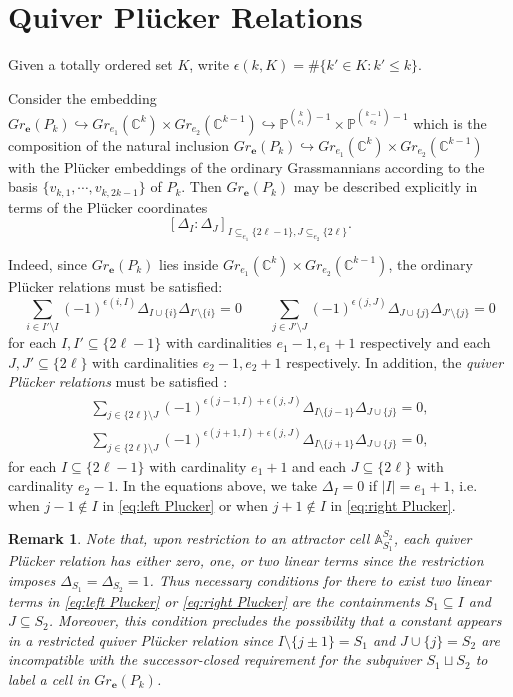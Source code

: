 \documentclass{amsart}
\newtheorem{remark}[theorem]{Remark}
\numberwithin{equation}{section}
\renewcommand{\AA}{\mathbb{A}}
\newcommand{\CC}{\mathbb{C}}
\newcommand{\PP}{\mathbb{P}}
\newcommand{\bfe}{\mathbf{e}}
\newcommand{\into}{\hookrightarrow}
\begin{document}
\section{Quiver Pl\"ucker Relations}
  Given a totally ordered set $K$, write $\epsilon(k,K)=\#\{k'\in K: k'\le k\}$.

  Consider the embedding $Gr_\bfe(P_k)\into Gr_{e_1}(\CC^k)\times Gr_{e_2}(\CC^{k-1})\into \PP^{{k \choose e_1} - 1}\times \PP^{{k-1 \choose e_2} - 1}$ which is the composition of the natural inclusion $Gr_\bfe(P_k)\into Gr_{e_1}(\CC^k)\times Gr_{e_2}(\CC^{k-1})$ with the Pl\"ucker embeddings of the ordinary Grassmannians according to the basis $\{v_{k,1},\cdots,v_{k,2k-1}\}$ of $P_k$.
  Then $Gr_\bfe(P_k)$ may be described explicitly in terms of the Pl\"ucker coordinates 
  \[[\Delta_I:\Delta_J]_{I\subseteq_{e_1} \{2\ell-1\}, J\subseteq_{e_2} \{2\ell\}}.\]
  
  Indeed, since $Gr_\bfe(P_k)$ lies inside $Gr_{e_1}(\CC^k)\times Gr_{e_2}(\CC^{k-1})$, the ordinary Pl\"ucker relations must be satisfied:
  \[\sum_{i\in I'\setminus I} (-1)^{\epsilon(i,I)} \Delta_{I\cup\{i\}} \Delta_{I'\setminus\{i\}}=0
    \qquad
    \sum_{j\in J'\setminus J} (-1)^{\epsilon(j,J)} \Delta_{J\cup\{j\}} \Delta_{J'\setminus\{j\}}=0\]
  for each $I,I'\subseteq\{2\ell-1\}$ with cardinalities $e_1-1,e_1+1$ respectively and each $J,J'\subseteq\{2\ell\}$ with cardinalities $e_2-1,e_2+1$ respectively.
  In addition, the \emph{quiver Pl\"ucker relations} must be satisfied \cite{lorscheid-weist}:
  \begin{align}
    \label{eq:left Plucker} \sum_{j\in \{2\ell\}\setminus J} (-1)^{\epsilon(j-1,I)+\epsilon(j,J)} \Delta_{I\setminus\{j-1\}} \Delta_{J\cup\{j\}}=0,\\
    \label{eq:right Plucker} \sum_{j\in \{2\ell\}\setminus J} (-1)^{\epsilon(j+1,I)+\epsilon(j,J)} \Delta_{I\setminus\{j+1\}} \Delta_{J\cup\{j\}}=0,
  \end{align}
  for each $I\subseteq\{2\ell-1\}$ with cardinality $e_1+1$ and each $J\subseteq\{2\ell\}$ with cardinality $e_2-1$.
  In the equations above, we take $\Delta_I=0$ if $|I|=e_1+1$, i.e. when $j-1\notin I$ in \eqref{eq:left Plucker} or when $j+1\notin I$ in \eqref{eq:right Plucker}.
  \begin{remark}
    \label{rm:linear terms}
    Note that, upon restriction to an attractor cell $\AA_{S_1}^{S_2}$, each quiver Pl\"ucker relation has either zero, one, or two linear terms since the restriction imposes $\Delta_{S_1}=\Delta_{S_2}=1$.
    Thus necessary conditions for there to exist two linear terms in \eqref{eq:left Plucker} or \eqref{eq:right Plucker} are the containments $S_1\subseteq I$ and $J\subseteq S_2$.
    Moreover, this condition precludes the possibility that a constant appears in a restricted quiver Pl\"ucker relation since $I\setminus\{j\pm1\}=S_1$ and $J\cup\{j\}=S_2$ are incompatible with the successor-closed requirement for the subquiver $S_1\sqcup S_2$ to label a cell in $Gr_\bfe(P_k)$.
  \end{remark}
\end{document}
